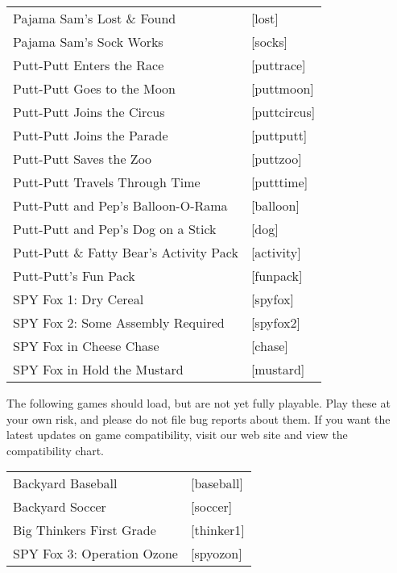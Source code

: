 \begin{itemize}
\begin{tabular}[h]{ll}
    Pajama Sam's Lost \& Found&                    [lost]\\
    Pajama Sam's Sock Works&                       [socks]\\
    Putt-Putt Enters the Race&                     [puttrace]\\
    Putt-Putt Goes to the Moon&                    [puttmoon]\\
    Putt-Putt Joins the Circus&                    [puttcircus]\\
    Putt-Putt Joins the Parade&                    [puttputt]\\
    Putt-Putt Saves the Zoo&                       [puttzoo]\\
    Putt-Putt Travels Through Time&                [putttime]\\
    Putt-Putt and Pep's Balloon-O-Rama&            [balloon]\\
    Putt-Putt and Pep's Dog on a Stick&            [dog]\\
    Putt-Putt \& Fatty Bear's Activity Pack&       [activity]\\
    Putt-Putt's Fun Pack&                          [funpack]\\
    SPY Fox 1: Dry Cereal&                         [spyfox]\\
    SPY Fox 2: Some Assembly Required&             [spyfox2]\\
    SPY Fox in Cheese Chase&                       [chase]\\
    SPY Fox in Hold the Mustard&                   [mustard]\\
  \end{tabular}

The following games should load, but are not yet fully playable. Play these at
your own risk, and please do not file bug reports about them. If you want
the latest updates on game compatibility, visit our web site and view the
compatibility chart.

  \begin{tabular}{ll}
    Backyard Baseball&                             [baseball]\\
    Backyard Soccer&                               [soccer]\\
    Big Thinkers First Grade&                      [thinker1]\\
    SPY Fox 3: Operation Ozone&                    [spyozon]\\
  \end{tabular}


\end{itemize}

